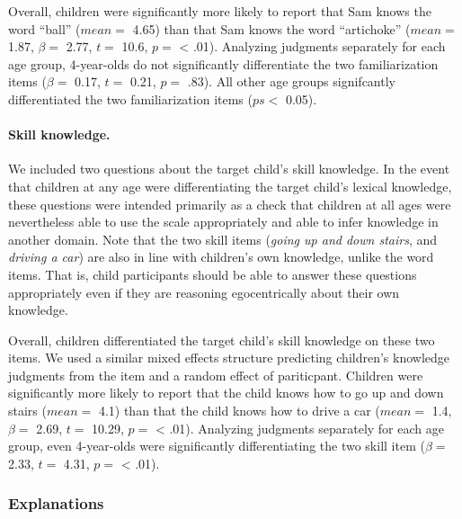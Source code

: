\documentclass[10pt, letterpaper]{article}
\begin{document}
Overall, children were significantly more likely to report that Sam
knows the word ``ball'' (\(mean =\) 4.65) than that Sam knows the word
``artichoke'' (\(mean =\) 1.87, \(\beta =\) 2.77, \(t =\) 10.6, \(p =\)
\textless{} .01). Analyzing judgments separately for each age group,
4-year-olds do not significantly differentiate the two familiarization
items (\(\beta =\) 0.17, \(t =\) 0.21, \(p =\) .83). All other age
groups signifcantly differentiated the two familiarization items
(\(ps <\) 0.05).

\hypertarget{skill-knowledge.}{%
\paragraph{Skill knowledge.}\label{skill-knowledge.}}

We included two questions about the target child's skill knowledge. In
the event that children at any age were differentiating the target
child's lexical knowledge, these questions were intended primarily as a
check that children at all ages were nevertheless able to use the scale
appropriately and able to infer knowledge in another domain. Note that
the two skill items (\emph{going up and down stairs}, and \emph{driving
a car}) are also in line with children's own knowledge, unlike the word
items. That is, child participants should be able to answer these
questions appropriately even if they are reasoning egocentrically about
their own knowledge.

Overall, children differentiated the target child's skill knowledge on
these two items. We used a similar mixed effects structure predicting
children's knowledge judgments from the item and a random effect of
pariticpant. Children were significantly more likely to report that the
child knows how to go up and down stairs (\(mean =\) 4.1) than that the
child knows how to drive a car (\(mean =\) 1.4, \(\beta =\) 2.69,
\(t =\) 10.29, \(p =\) \textless{} .01). Analyzing judgments separately
for each age group, even 4-year-olds were significantly differentiating
the two skill item (\(\beta =\) 2.33, \(t =\) 4.31, \(p =\) \textless{}
.01).

\hypertarget{explanations}{%
\subsubsection{Explanations}\label{explanations}}
\end{document}
